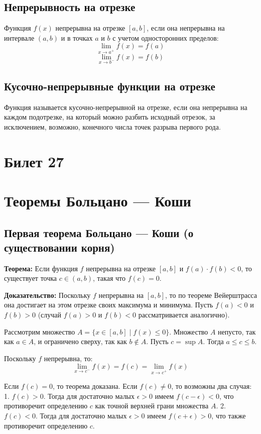 \documentclass{article}
\begin{document}
\subsection*{Непрерывность на отрезке}
Функция \( f(x) \) непрерывна на отрезке \( [a, b] \), если она непрерывна на интервале \( (a, b) \) и в точках \( a \) и \( b \) с учетом односторонних пределов:
\[
\lim_{x \to a^+} f(x) = f(a)
\]
\[
\lim_{x \to b^-} f(x) = f(b)
\]

\subsection*{Кусочно-непрерывные функции на отрезке}
Функция называется кусочно-непрерывной на отрезке, если она непрерывна на каждом подотрезке, на который можно разбить исходный отрезок, за исключением, возможно, конечного числа точек разрыва первого рода.

\section{Билет 27}

\section*{Теоремы Больцано — Коши}

\subsection*{Первая теорема Больцано — Коши (о существовании корня)}

\textbf{Теорема:} Если функция \( f \) непрерывна на отрезке \([a, b]\) и \( f(a) \cdot f(b) < 0 \), то существует точка \( c \in (a, b) \), такая что \( f(c) = 0 \).

\textbf{Доказательство:} Поскольку \( f \) непрерывна на \([a, b]\), то по теореме Вейерштрасса она достигает на этом отрезке своих максимума и минимума. Пусть \( f(a) < 0 \) и \( f(b) > 0 \) (случай \( f(a) > 0 \) и \( f(b) < 0 \) рассматривается аналогично).

Рассмотрим множество \( A = \{ x \in [a, b] \mid f(x) \leq 0 \} \). Множество \( A \) непусто, так как \( a \in A \), и ограничено сверху, так как \( b \notin A \). Пусть \( c = \sup A \). Тогда \( a \leq c \leq b \).

Поскольку \( f \) непрерывна, то:
\[
\lim_{x \to c^-} f(x) = f(c) = \lim_{x \to c^+} f(x)
\]

Если \( f(c) = 0 \), то теорема доказана. Если \( f(c) \neq 0 \), то возможны два случая:
1. \( f(c) > 0 \). Тогда для достаточно малых \( \epsilon > 0 \) имеем \( f(c - \epsilon) < 0 \), что противоречит определению \( c \) как точной верхней грани множества \( A \).
2. \( f(c) < 0 \). Тогда для достаточно малых \( \epsilon > 0 \) имеем \( f(c + \epsilon) > 0 \), что также противоречит определению \( c \).
\end{document}

